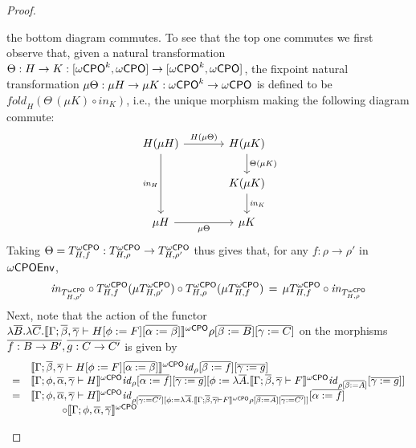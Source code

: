\documentclass[acmsmall,review,anonymous]{acmart}
\theoremstyle{definition}
\renewcommand{\id}{\mathit{id}}
\begin{document}
\begin{proof}
\begin{itemize}
the bottom diagram commutes. To see that the top one commutes
we first observe that, given a natural transformation $\Theta : H \to
K : [{\omega\mathsf{CPO}}^k, {\omega\mathsf{CPO}}] \to [{\omega\mathsf{CPO}}^k, {\omega\mathsf{CPO}}]$, the fixpoint natural
transformation $\mu \Theta : \mu H \to \mu K : {\omega\mathsf{CPO}}^k \to {\omega\mathsf{CPO}}$ is
defined to be $\mathit{fold}_{H}(\Theta\,(\mu K) \circ
\mathit{in}_{K})$, i.e., the unique morphism making the following
diagram commute:\label{page:dia1}
{\footnotesize
\[\begin{tikzcd}[column sep = large]
H(\mu H)
	\ar[dd, "{\mathit{in}_H}"']
	\ar[r, "{H(\mu \Theta)}"]
& H(\mu K)
	\ar[d, "{\Theta (\mu K)}"] \\
& K(\mu K)
	\ar[d, "{\mathit{in}_K}"] \\
\mu H
	\ar[r, "{\mu \Theta}"']
& \mu K
\end{tikzcd}\]}
Taking $\Theta = T^{{\omega\mathsf{CPO}}}_{H,f}: T^{{\omega\mathsf{CPO}}}_{H,\rho} \to
T^{{\omega\mathsf{CPO}}}_{H,\rho'}$ thus gives that, for any $f : \rho \to \rho'$ in
$\omega\mathsf{CPOEnv}$,
\begin{equation}\label{eq:mu-sigma-def}
\mathit{in}_{T^{{\omega\mathsf{CPO}}}_{H,\rho'}} \circ 
T^{{\omega\mathsf{CPO}}}_{H,f} (\mu T^{{\omega\mathsf{CPO}}}_{H,\rho'}) \circ 
T^{{\omega\mathsf{CPO}}}_{H,\rho}(\mu T^{{\omega\mathsf{CPO}}}_{H,f}) \,=\, 
\mu T^{{\omega\mathsf{CPO}}}_{H,f} \circ \mathit{in}_{T^{{\omega\mathsf{CPO}}}_{H,\rho}}
\end{equation}
Next, note that the action of the functor
$\lambda \overline{B}. \lambda \overline{C}. \llbracket{\Gamma; \overline{\beta},
  \overline{\gamma} \vdash H[\phi := F][\overline{\alpha := \beta}]}\rrbracket^{{\omega\mathsf{CPO}}}\rho
        [\overline{\beta := B}] [\overline{\gamma := C}]$
on the morphisms $\overline{f : B \to B'}, \overline{g : C \to C'}$ is given by
\[\begin{array}{ll}
 & \oCPOsem{\Gamma; \ol{\beta}, \ol{\gamma} \vdash H[\phi :=
      F][\ol{\alpha := \beta}]} \id_{\rho} [\ol{\beta := f}]
           [\ol{\gamma := g}]\\
= & \oCPOsem{\Gamma; \phi, \ol{\alpha}, \ol{\gamma} \vdash H}
\id_{\rho}[\ol{\alpha := f}] [\ol{\gamma := g}][\phi := \lambda
  \ol{A}. \oCPOsem{\Gamma; \ol{\beta}, \ol{\gamma} \vdash F} \id_{\rho
    [\ol{\beta := A}]} [\ol{\gamma := g}]] \\ 
=& \oCPOsem{\Gamma; \phi, \ol{\alpha}, \ol{\gamma} \vdash H} \id_{\rho
  [\ol{\gamma := C'}][\phi := \lambda \ol{A}. \oCPOsem{\Gamma;
      \ol{\beta}, \ol{\gamma} \vdash F} \rho [\ol{\beta := A}]
    [\ol{\gamma := C'}]]} [\ol{\alpha := f}] \\
&\hspace{3em} \circ \oCPOsem{\Gamma; \phi, \ol{\alpha}, \ol{\gamma}
}
\end{array}\]
\end{itemize}
\end{proof}
\end{document}
